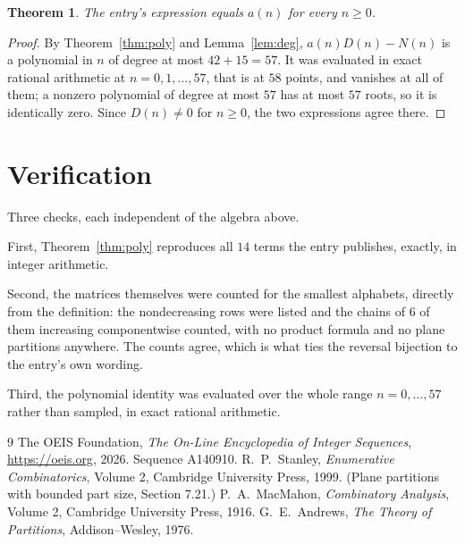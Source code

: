 \documentclass[11pt,a4paper]{article}
\theoremstyle{plain}
\newtheorem{theorem}{Theorem}
\theoremstyle{definition}
\begin{document}
\begin{theorem}
The entry's expression equals $a(n)$ for every $n\ge0$.
\end{theorem}

\begin{proof}
By Theorem~\ref{thm:poly} and Lemma~\ref{lem:deg}, $a(n)D(n)-N(n)$ is a polynomial in $n$
of degree at most $42+15=57$. It was evaluated in exact rational arithmetic at
$n=0,1,\dots,57$, that is at $58$ points, and vanishes at all of them; a nonzero polynomial
of degree at most $57$ has at most $57$ roots, so it is identically zero. Since $D(n)\neq0$
for $n\ge0$, the two expressions agree there.
\end{proof}

\section{Verification}

Three checks, each independent of the algebra above.

First, Theorem~\ref{thm:poly} reproduces all $14$ terms the entry publishes,
exactly, in integer arithmetic.

Second, the matrices themselves were counted for the smallest alphabets, directly from the
definition: the nondecreasing rows were listed and the chains of $6$ of them increasing
componentwise counted, with no product formula and no plane partitions anywhere. The counts
agree, which is what ties the reversal bijection to the entry's own wording.

Third, the polynomial identity was evaluated over the whole range $n=0,\dots,57$ rather than
sampled, in exact rational arithmetic.

\begin{thebibliography}{9}
 The OEIS Foundation, \emph{The On-Line Encyclopedia of Integer
Sequences}, \url{https://oeis.org}, 2026. Sequence A140910.
 R.~P.~Stanley, \emph{Enumerative Combinatorics}, Volume 2, Cambridge
University Press, 1999. (Plane partitions with bounded part size, Section 7.21.)
 P.~A.~MacMahon, \emph{Combinatory Analysis}, Volume 2, Cambridge
University Press, 1916.
 G.~E.~Andrews, \emph{The Theory of Partitions}, Addison--Wesley, 1976.
\end{thebibliography}
\end{document}
